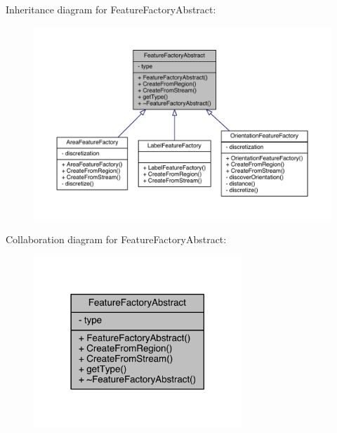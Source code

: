 Inheritance diagram for Feature\+Factory\+Abstract\+:\nopagebreak
\begin{figure}[H]
\begin{center}
\leavevmode
\includegraphics[width=350pt]{class_feature_factory_abstract__inherit__graph}
\end{center}
\end{figure}


Collaboration diagram for Feature\+Factory\+Abstract\+:\nopagebreak
\begin{figure}[H]
\begin{center}
\leavevmode
\includegraphics[width=222pt]{class_feature_factory_abstract__coll__graph}
\end{center}
\end{figure}


